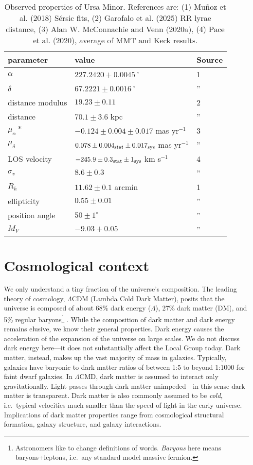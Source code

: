 \begin{table*}[t]
\centering
\caption[Observed Properties of Ursa Minor]{Observed properties of Ursa Minor. References are: (1) Muñoz et al. (2018) Sérsic fits, (2) Garofalo et al. (2025) RR lyrae distance, (3) Alan W. McConnachie and Venn (2020a), (4) Pace et al. (2020), average of MMT and Keck results. }
\label{tbl:umi_obs_props}
\begin{tabular}{lll}
\toprule
parameter & value & Source\\
\midrule
$\alpha$ & $ 227.2420 \pm 0.0045$˚ & 1\\
$\delta$ & $67.2221 \pm 0.0016$˚ & ”\\
distance modulus & $19.23 \pm 0.11$ & 2\\
distance & $70.1 \pm 3.6$ kpc & ”\\
$\mu_\alpha*$ & $-0.124 \pm 0.004 \pm 0.017$ mas yr$^{-1}$ & 3\\
$\mu_\delta$ & $0.078 \pm 0.004_{\rm stat} \pm 0.017_{\rm sys}$ mas yr$^{-1}$ & ”\\
LOS velocity & $-245.9 \pm 0.3_{\rm stat} \pm 1_{\rm sys}$ km s$^{-1}$ & 4\\
$\sigma_v$ & $8.6 \pm 0.3$ & ”\\
$R_h$ & $11.62 \pm 0.1$ arcmin & 1\\
ellipticity & $0.55 \pm 0.01$ & ”\\
position angle & $50 \pm 1^\circ$ & ”\\
$M_V$ & $-9.03 \pm 0.05$ & ”\\
\bottomrule
\end{tabular}
\end{table*}

\section{Cosmological context}\label{cosmological-context}

We only understand a tiny fraction of the universe's composition. The
leading theory of cosmology, \(\Lambda\)CDM (Lambda Cold Dark Matter),
posits that the universe is composed of about 68\% dark energy
(\(\Lambda\)), 27\% dark matter (DM), and 5\% regular baryons\footnote{Astronomers
  like to change definitions of words. \emph{Baryons} here means
  baryons+leptons, i.e.~any standard model massive fermion.}
\citep{planckcollaboration+2020}. While the composition of dark matter
and dark energy remains elusive, we know their general properties. Dark
energy causes the acceleration of the expansion of the universe on large
scales. We do not discuss dark energy here---it does not substantially
affect the Local Group today. Dark matter, instead, makes up the vast
majority of mass in galaxies. Typically, galaxies have baryonic to dark
matter ratios of between 1:5 to beyond 1:1000 for faint dwarf galaxies.
In \(\Lambda\)CMD, dark matter is assumed to interact only
gravitationally. Light passes through dark matter unimpeded---in this
sense dark matter is transparent. Dark matter is also commonly assumed
to be \emph{cold}, i.e.~typical velocities much smaller than the speed
of light in the early universe. Implications of dark matter properties
range from cosmological structural formation, galaxy structure, and
galaxy interactions.

